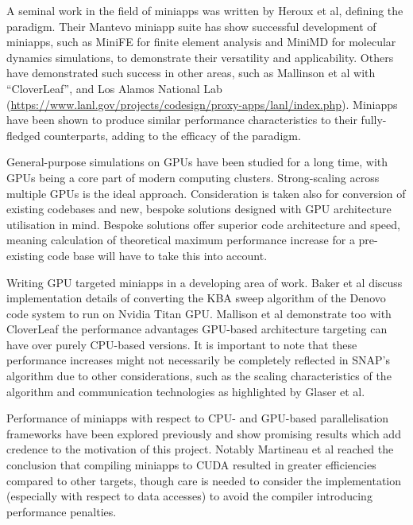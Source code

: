 \documentclass[conference]{IEEEtran}
\begin{document}
A seminal work in the field of miniapps was written by Heroux et al\cite{miniapps}, defining the paradigm. Their Mantevo miniapp suite has show successful development of miniapps, such as MiniFE for finite element analysis and MiniMD for molecular dynamics simulations, to demonstrate their versatility and applicability. Others have demonstrated such success in other areas, such as Mallinson et al with ``CloverLeaf”\cite{mallinson2013cloverleaf}, and Los Alamos National Lab (\url{https://www.lanl.gov/projects/codesign/proxy-apps/lanl/index.php}). Miniapps have been shown to produce similar performance characteristics to their fully-fledged counterparts\cite{miniapps}, adding to the efficacy of the paradigm.

General-purpose simulations on GPUs have been studied for a long time, with GPUs being a core part of modern computing clusters\cite{debardeleben2013gpu}. Strong-scaling across multiple GPUs\cite{glaser2015strong} is the ideal approach. Consideration is taken also for conversion of existing codebases\cite{zhou2011gpu} and new, bespoke solutions designed with GPU architecture utilisation in mind\cite{glaser2015strong}. Bespoke solutions offer superior code architecture and speed, meaning calculation of theoretical maximum performance increase for a pre-existing code base will have to take this into account.

Writing GPU targeted miniapps in a developing area of work. Baker et al\cite{baker2012high} discuss implementation details of converting the KBA sweep algorithm of the Denovo code system to run on Nvidia Titan GPU. Mallison et al\cite{mallinson2013cloverleaf} demonstrate too with CloverLeaf the performance advantages GPU-based architecture targeting can have over purely CPU-based versions. It is important to note that these performance increases might not necessarily be completely reflected in SNAP’s algorithm due to other considerations, such as the scaling characteristics of the algorithm\cite{shoukourian2014predicting} and communication technologies as highlighted by Glaser et al\cite{glaser2015strong}.

Performance of miniapps with respect to CPU- and GPU-based parallelisation frameworks have been explored previously and show promising results which add credence to the motivation of this project. Notably Martineau et al\cite{martineau2017productivity} reached the conclusion that compiling miniapps to CUDA resulted in greater efficiencies compared to other targets, though care is needed to consider the implementation (especially with respect to data accesses) to avoid the compiler introducing performance penalties.
\end{document}
